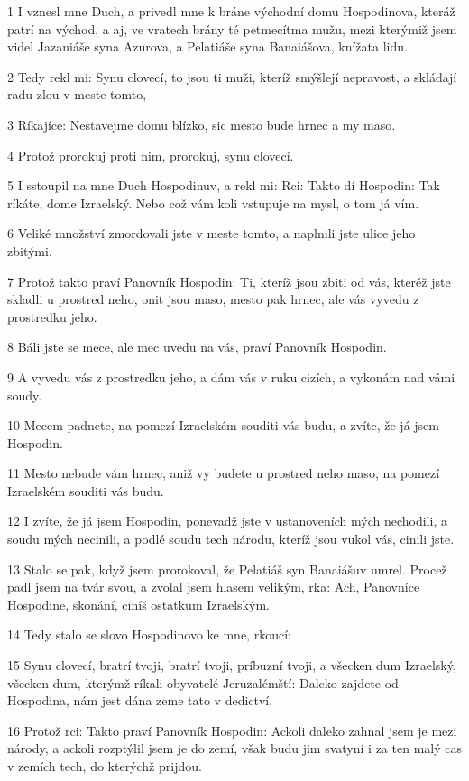 \par 1 I vznesl mne Duch, a privedl mne k bráne východní domu Hospodinova, kteráž patrí na východ, a aj, ve vratech brány té petmecítma mužu, mezi kterýmiž jsem videl Jazaniáše syna Azurova, a Pelatiáše syna Banaiášova, knížata lidu.
\par 2 Tedy rekl mi: Synu clovecí, to jsou ti muži, kteríž smýšlejí nepravost, a skládají radu zlou v meste tomto,
\par 3 Ríkajíce: Nestavejme domu blízko, sic mesto bude hrnec a my maso.
\par 4 Protož prorokuj proti nim, prorokuj, synu clovecí.
\par 5 I sstoupil na mne Duch Hospodinuv, a rekl mi: Rci: Takto dí Hospodin: Tak ríkáte, dome Izraelský. Nebo což vám koli vstupuje na mysl, o tom já vím.
\par 6 Veliké množství zmordovali jste v meste tomto, a naplnili jste ulice jeho zbitými.
\par 7 Protož takto praví Panovník Hospodin: Ti, kteríž jsou zbiti od vás, kteréž jste skladli u prostred neho, onit jsou maso, mesto pak hrnec, ale vás vyvedu z prostredku jeho.
\par 8 Báli jste se mece, ale mec uvedu na vás, praví Panovník Hospodin.
\par 9 A vyvedu vás z prostredku jeho, a dám vás v ruku cizích, a vykonám nad vámi soudy.
\par 10 Mecem padnete, na pomezí Izraelském souditi vás budu, a zvíte, že já jsem Hospodin.
\par 11 Mesto nebude vám hrnec, aniž vy budete u prostred neho maso, na pomezí Izraelském souditi vás budu.
\par 12 I zvíte, že já jsem Hospodin, ponevadž jste v ustanoveních mých nechodili, a soudu mých necinili, a podlé soudu tech národu, kteríž jsou vukol vás, cinili jste.
\par 13 Stalo se pak, když jsem prorokoval, že Pelatiáš syn Banaiášuv umrel. Procež padl jsem na tvár svou, a zvolal jsem hlasem velikým, rka: Ach, Panovníce Hospodine, skonání, ciníš ostatkum Izraelským.
\par 14 Tedy stalo se slovo Hospodinovo ke mne, rkoucí:
\par 15 Synu clovecí, bratrí tvoji, bratrí tvoji, príbuzní tvoji, a všecken dum Izraelský, všecken dum, kterýmž ríkali obyvatelé Jeruzalémští: Daleko zajdete od Hospodina, nám jest dána zeme tato v dedictví.
\par 16 Protož rci: Takto praví Panovník Hospodin: Ackoli daleko zahnal jsem je mezi národy, a ackoli rozptýlil jsem je do zemí, však budu jim svatyní i za ten malý cas v zemích tech, do kterýchž prijdou.

